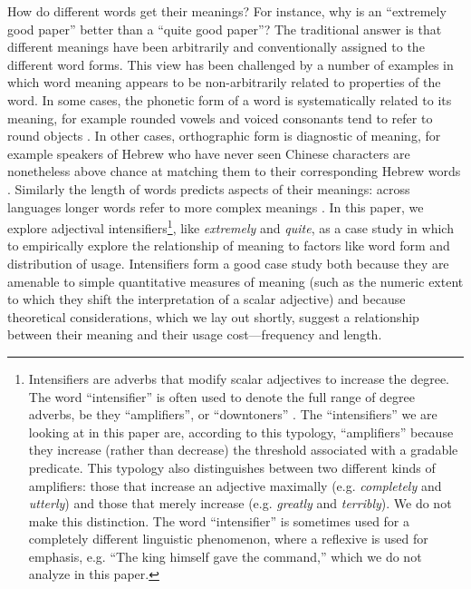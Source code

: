 \documentclass[10pt,letterpaper]{article}
\newcommand{\w}[1]{\emph{#1}}
\begin{document}
How do different words get their meanings?
For instance, why is an ``extremely good paper'' better than a ``quite good paper''? The traditional answer \cite{saussure} is that different meanings have been arbitrarily and conventionally assigned to the different word forms.
This view has been challenged by a number of examples in which word meaning appears to be non-arbitrarily related to properties of the word.
In some cases, the phonetic form of a word is systematically related to its meaning, for example rounded vowels and voiced consonants tend to refer to round objects \cite{maluma-takete, bouba-kiki, bouba-kiki2, takete-uloomo}. 
In other cases, orthographic form is diagnostic of meaning, for example speakers of Hebrew who have never seen Chinese characters are nonetheless above chance at matching them to their corresponding Hebrew words \cite{koriat}. 
Similarly the length of words predicts aspects of their meanings: across languages longer words refer to more complex meanings \cite{lewis}.
In this paper, we explore adjectival intensifiers\footnote{Intensifiers are adverbs that modify scalar adjectives to increase the degree. The word ``intensifier'' is often used to denote the full range of degree adverbs, be they ``amplifiers'', or ``downtoners'' \cite{quirk}. The ``intensifiers'' we are looking at in this paper are, according to this typology, ``amplifiers'' because they increase (rather than decrease) the threshold associated with a gradable predicate. This typology also distinguishes between two different kinds of amplifiers: those that increase an adjective maximally (e.g. \w{completely} and \w{utterly}) and those that merely increase (e.g. \w{greatly} and \w{terribly}). We do not make this distinction. The word ``intensifier'' is sometimes used for a completely different linguistic phenomenon, where a reflexive is used for emphasis, e.g. ``The king himself gave the command,'' which we do not analyze in this paper.}, like \w{extremely} and \w{quite},
as a case study in which to empirically explore the relationship of meaning to factors like word form and distribution of usage.
Intensifiers form a good case study both because they are amenable to simple quantitative measures of meaning (such as the numeric extent to which they shift the interpretation of a scalar adjective) and because theoretical considerations, which we lay out shortly, suggest a relationship between their meaning and their usage cost---frequency and length.
\end{document}
